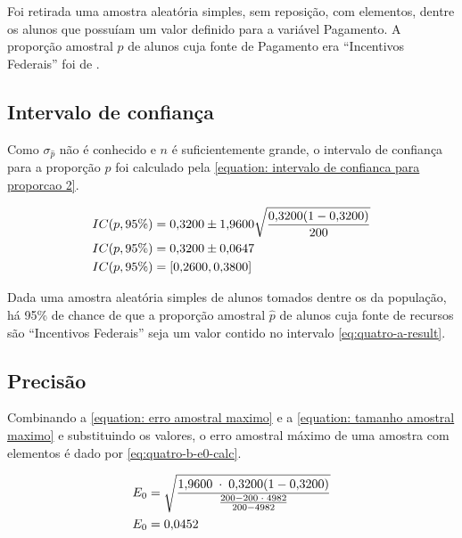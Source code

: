 

	Foi retirada uma amostra aleatória simples, sem reposição, com \QUATROn
	elementos, dentre os \QUATRON alunos que possuíam um valor definido para a
	variável Pagamento. A proporção amostral $\hat{p}$ de alunos cuja fonte de
	Pagamento era ``Incentivos Federais'' foi de \QUATROpAmostral.

\subsection{Intervalo de confiança}

	Como $\sigma_{\hat{p}}$ não é conhecido e $n$ é suficientemente grande,
	o intervalo de confiança para a proporção $p$ foi calculado pela
	\autoref{equation: intervalo de confianca para proporcao 2}.

	\begin{align} 
		IC(p, 95\%) &= \num{0.32} \pm \num{1.96} \sqrt{\frac{\num{0.32} (1- \num{0.32})}{200}} \nonumber \\
		IC(p, 95\%) &= \num{0.32} \pm \num{0.0647} \nonumber \\
		                \label{eq:quatro-a-result}
		IC(p, 95\%) &= [\num{0.26}, \num{0.38}]
	\end{align}

	Dada uma amostra aleatória simples de \QUATROn alunos tomados dentre os
	\QUATRON da população, há 95\% de chance de que a proporção amostral $\hat{p}$ 
    de alunos cuja fonte de recursos são ``Incentivos Federais'' seja um valor 
    contido no intervalo \eqref{eq:quatro-a-result}.

\subsection{Precisão}

	Combinando a \autoref{equation: erro amostral maximo} e a \autoref{equation: tamanho amostral maximo} e
	substituindo os valores, o erro amostral máximo de uma amostra com
	\QUATROn elementos é dado por \eqref{eq:quatro-b-e0-calc}.

	\begin{align}
		E_0 &= \label{eq:quatro-b-e0-calc}
               \sqrt{\frac{\num{1.96} \;\cdot\; \num{0.32} (1 - \num{0.32}) }{\frac{200 - 200 \;\cdot\; 4982}{200 - 4982}}}  \\
		E_0 &= \num{0.0452} \nonumber
	\end{align}

